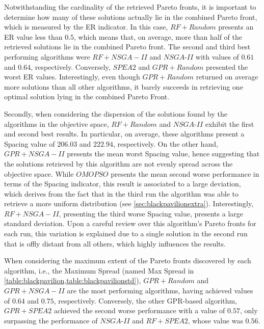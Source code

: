 Notwithstanding the cardinality of the retrieved Pareto fronts, it is important to determine how many of these solutions actually lie in the combined Pareto front, which is measured by the \ac{ER} indicator. In this case, $RF+Random$ presents an \ac{ER} value less than $0.5$, which means that, on average, more than half of the retrieved solutions lie in the combined Pareto front. The second and third best performing algorithms were $RF+NSGA-II$ and $NSGA$-$II$ with values of $0.61$ and $0.64$, respectively. Conversely, $SPEA2$ and $GPR+Random$ presented the worst \ac{ER} values. Interestingly, even though $GPR+Random$ returned on average more solutions than all other algorithms, it barely succeeds in retrieving one optimal solution lying in the combined Pareto Front.

Secondly, when considering the dispersion of the solutions found by the algorithms in the objective space, $RF+Random$ and $NSGA$-$II$ exhibit the first and second best results. In particular, on average, these algorithms present a Spacing value of $206.03$ and $222.94$, respectively. On the other hand, $GPR+NSGA-II$ presents the mean worst Spacing value, hence suggesting that the solutions retrieved by this algorithm are not evenly spread across the objective space. While $OMOPSO$ presents the mean second worse performance in terms of the Spacing indicator, this result is associated to a large deviation, which derives from the fact that in the third run the algorithm was able to retrieve a more uniform distribution (see \cref{sec:blackpavilionextra}). Interestingly, $RF+NSGA-II$, presenting the third worse Spacing value, presents a large standard deviation. Upon a careful review over this algorithm's Pareto fronts for each run, this variation is explained due to a single solution in the second run that is offly distant from all others, which highly influences the results. 

When considering the maximum extent of the Pareto fronts discovered by each algorithm, i.e., the Maximum Spread (named Max Spread in \cref{table:blackpavilion,table:blackpavilionstd}), $GPR+Random$ and $GPR+NSGA-II$ are the most performing algorithms, having achieved values of $0.64$ and $0.75$, respectively. Conversely, the other \ac{GPR}-based algorithm, $GPR+SPEA2$ achieved the second worse performance with a value of $0.57$, only surpassing the performance of $NSGA$-$II$ and $RF+SPEA2$, whose value was $0.56$. 

